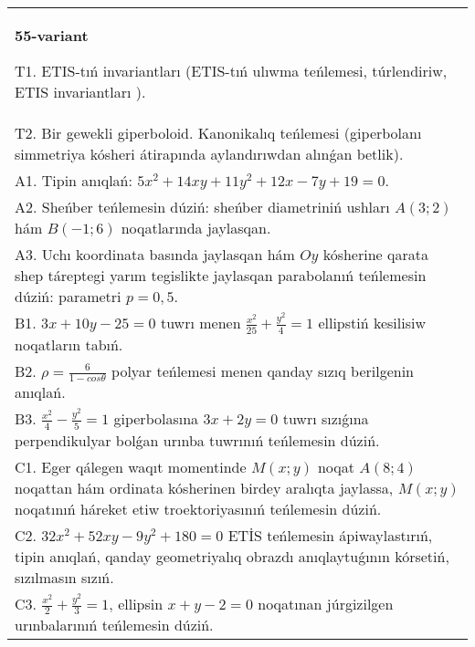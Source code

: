 \documentclass{article}
\begin{document}
\begin{tabular}{m{17cm}}
\textbf{55-variant}
\newline

T1. ETIS-tıń invariantları (ETIS-tıń ulıwma teńlemesi, túrlendiriw, ETIS invariantları ).\\

T2. Bir gewekli giperboloid. Kanonikalıq teńlemesi (giperbolanı simmetriya kósheri átirapında aylandırıwdan alınǵan betlik).\\

A1. Tipin anıqlań: $5 x^{2}+14 xy+11 y^{2}+12 x-7 y+19=0$.\\

A2. Sheńber teńlemesin dúziń: sheńber diametriniń ushları $A (3;2) $ hám $B (-1;6 ) $ noqatlarında jaylasqan.\\

A3. Uchı koordinata basında jaylasqan hám $Oy$ kósherine qarata shep táreptegi yarım tegislikte jaylasqan parabolanıń teńlemesin dúziń: parametri $p=0,5$.\\

B1. $3x + 10y - 25 = 0$ tuwrı menen $\frac{x^{2}}{25} + \frac{y^{2}}{4} = 1$ ellipstiń kesilisiw noqatların tabıń.\\

B2. $\rho = \frac{6}{1 - cos\theta}$ polyar teńlemesi menen qanday sızıq berilgenin anıqlań.  \\

B3. $\frac{x^{2}}{4} - \frac{y^{2}}{5} = 1$ giperbolasına $3x + 2y = 0$ tuwrı sızıǵına perpendikulyar bolǵan urınba tuwrınıń teńlemesin dúziń.\\

C1. Eger qálegen waqıt momentinde $M(x;y)$ noqat $A(8;4)$ noqattan hám ordinata kósherinen birdey aralıqta jaylassa, $M(x;y)$ noqatınıń háreket etiw troektoriyasınıń teńlemesin dúziń.  \\

C2. $32x^{2} + 52xy - 9y^{2} + 180 = 0$ ETİS teńlemesin ápiwaylastırıń, tipin anıqlań, qanday geometriyalıq obrazdı anıqlaytuǵının kórsetiń, sızılmasın sızıń.  \\

C3. $\frac{x^{2}}{2} + \frac{y^{2}}{3} = 1$, ellipsin $x + y - 2 = 0$ noqatınan júrgizilgen urınbalarınıń teńlemesin dúziń.  \\

\end{tabular}
\vspace{1cm}
\end{document}
